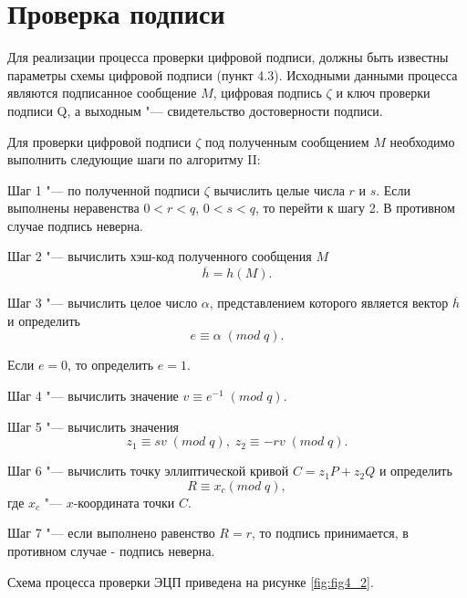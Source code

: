 \section{Проверка подписи}
\par
Для реализации процесса проверки цифровой подписи, должны быть известны параметры схемы цифровой подписи (пункт 4.3). Исходными данными процесса являются подписанное сообщение $M$, цифровая подпись $\zeta$ и ключ проверки подписи Q, а выходным "--- свидетельство достоверности подписи.
\par
Для проверки цифровой подписи $\zeta$ под полученным сообщением $M$ необходимо выполнить следующие шаги по алгоритму II:
\par
Шаг 1 "--- по полученной подписи $\zeta$ вычислить целые числа $r$ и $s$.  Если выполнены неравенства $0<r<q$, $0<s<q$, то перейти к шагу 2. В противном случае подпись неверна.
\par
Шаг 2 "--- вычислить хэш-код полученного сообщения $M$
\begin{equation*}
\overline{h} = h(M).
\end{equation*}
\par
Шаг 3 "--- вычислить целое число $\alpha$, представлением которого является вектор $\overline{h}$ и определить
\begin{equation*}
e\equiv \alpha\;(mod\;q).
\end{equation*}
\par
Если $e=0$, то определить $e=1$.
\par
Шаг 4 "--- вычислить значение $v \equiv e^{-1}\;(mod\; q)$.
\par
Шаг 5 "--- вычислить значения
\begin{equation*}
z_1\equiv sv\;(mod\;q),\; z_2\equiv -rv\;(mod\;q).
\end{equation*}
\par
Шаг 6 "--- вычислить точку эллиптической кривой $C = z_1P+z_2Q$ и определить
\begin{equation*}
R\equiv x_c(mod\;q),
\end{equation*}
где $x_c$ "--- $x$-координата точки $C$.
\par
Шаг 7 "--- если выполнено равенство $R=r$, то подпись принимается, в противном случае - подпись неверна.
\par
Схема процесса проверки ЭЦП приведена на рисунке \ref{fig:fig4_2}.
